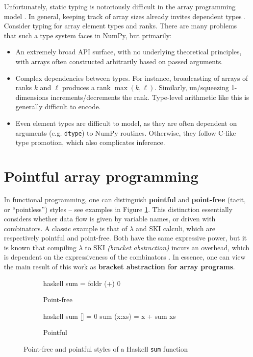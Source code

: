 Unfortunately, static typing is notoriously difficult in the array programming model \cite{liu2020type}. In general, keeping track of array sizes already invites dependent types \cite{henriksen2021towards}. Consider typing for array element types and ranks. There are many problems that such a type system faces in NumPy, but primarily:
\begin{itemize}
    \item An extremely broad API surface, with no underlying theoretical principles, with arrays often constructed arbitrarily based on passed arguments.
    \item Complex dependencies between types. For instance, broadcasting of arrays of ranks $k$ and $\ell$ produces a rank $\max(k, \ell)$. Similarly, un/squeezing 1-dimensions increments/decrements the rank. Type-level arithmetic like this is generally difficult to encode.
    \item Even element types are difficult to model, as they are often dependent on arguments (e.g. \texttt{dtype}) to NumPy routines. Otherwise, they follow C-like type promotion, which also complicates inference.
\end{itemize}

\section{Pointful array programming}
\label{pointful-array-programming}

In functional programming, one can distinguish \textbf{pointful} and \textbf{point-free} (tacit, or ``pointless'') styles -- see examples in Figure \ref{fig:point-haskell}. This distinction essentially considers whether data flow is given by variable names, or driven with combinators. A classic example is that of $\lambda$ and SKI calculi, which are respectively pointful and point-free. Both have the same expressive power, but it is known that compiling $\lambda$ to SKI \textit{(bracket abstraction)} incurs an overhead, which is dependent on the expressiveness of the combinators \cite{lachowski2018complexity}. 
In essence, one can view the main result of this work as \textbf{bracket abstraction for array programs}.

\begin{figure}
\centering
\begin{subfigure}{.3\textwidth}
  \centering
    \begin{cminted}{haskell}
sum = foldr (+) 0
    \end{cminted}
      \caption{Point-free}
\end{subfigure}%
\begin{subfigure}{.3\textwidth}
  \centering
  \begin{cminted}{haskell}
sum [] = 0
sum (x:xs) = x + sum xs
  \end{cminted}
  \caption{Pointful}
\end{subfigure}
\caption{Point-free and pointful styles of a Haskell \texttt{sum} function}
\label{fig:point-haskell}
\end{figure}

